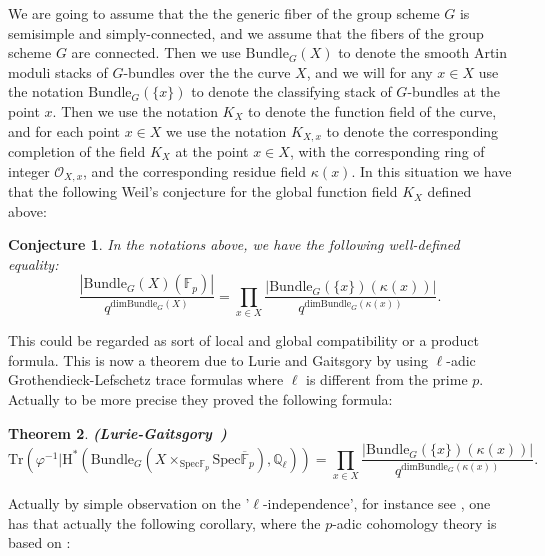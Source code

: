 \documentclass[11pt]{book}
\newtheorem{theorem}{Theorem}[section]
\newtheorem{conjecture}[theorem]{Conjecture}
\theoremstyle{definition}
\numberwithin{equation}{section}
\begin{document}
We are going to assume that the the generic fiber of the group scheme $G$ is semisimple and simply-connected, and we assume that the fibers of the group scheme $G$ are connected. Then we use $\mathrm{Bundle}_G(X)$ to denote the smooth Artin moduli stacks of $G$-bundles over the the curve $X$, and we will for any $x\in X$  use the notation $\mathrm{Bundle}_G(\{x\})$ to denote the classifying stack of $G$-bundles at the point $x$. Then we use the notation $K_X$ to denote the function field of the curve, and for each point $x\in X$ we use the notation $K_{X,x}$ to denote the corresponding completion of the field $K_X$ at the point $x\in X$, with the corresponding ring of integer $\mathcal{O}_{X,x}$, and the corresponding residue field $\kappa(x)$. In this situation we have that the following Weil's conjecture for the global function field $K_X$ defined above:


\begin{conjecture}
In the notations above, we have the following well-defined equality:
\begin{displaymath}
\frac{|\mathrm{Bundle}_G(X)(\mathbb{F}_p)|}{q^{\mathrm{dim}\mathrm{Bundle}_G(X)}}=\prod_{x\in X} \frac{|\mathrm{Bundle}_G(\{x\})(\kappa(x))|}{q^{\mathrm{dim}\mathrm{Bundle}_G(\kappa(x))}}.	
\end{displaymath}
	
\end{conjecture}
 
 
This could be regarded as sort of local and global compatibility or a product formula. This is now a theorem due to Lurie and Gaitsgory \cite{GL1} by using $\ell$-adic Grothendieck-Lefschetz trace formulas where $\ell$ is different from the prime $p$. Actually to be more precise they proved the following formula:


\begin{theorem}\mbox{\bf (Lurie-Gaitsgory \cite[Theorem 1.4.4.1]{GL1})}\\
\begin{displaymath}
\mathrm{Tr}(\varphi^{-1}|\mathrm{H}^*(\mathrm{Bundle}_G(X\times_{\mathrm{Spec}\mathbb{F}_p} \mathrm{Spec}\overline{\mathbb{F}}_p),\mathbb{Q}_\ell))=\prod_{x\in X} \frac{|\mathrm{Bundle}_G(\{x\})(\kappa(x))|}{q^{\mathrm{dim}\mathrm{Bundle}_G(\kappa(x))}}.	
\end{displaymath}	
\end{theorem}


Actually by simple observation on the '$\ell$-independence', for instance see \cite[Section 3.2]{Abe1}, one has that actually the following corollary, where the $p$-adic cohomology theory is based on \cite{Abe1}:
\end{document}
